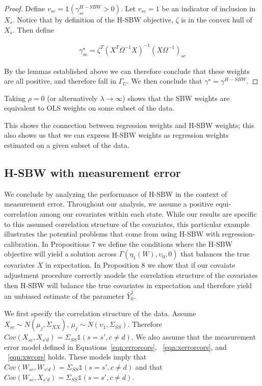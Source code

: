\begin{proof}
Define $v_{sc} = \mathds{1}(\gamma_{sc}^{H-SBW} > 0)$. Let $v_{sc} = 1$ be an indicator of inclusion in $X_s$. Notice that by definition of the H-SBW objective, $\zeta$ is in the convex hull of $X_s$. Then define

\begin{align*}
    \gamma_{sc}^\star = \zeta^T(X^T\Omega^{-1}X)^{-1}(X\Omega^{-1})_{sc}
\end{align*}

By the lemmas established above we can therefore conclude that these weights are all positive, and therefore fall in $\Gamma_U$. We then conclude that $\gamma^\star = \gamma^{H-SBW}$.
\end{proof}

\begin{remark}
Taking $\rho = 0$ (or alternatively $\lambda \to \infty$) shows that the SBW weights are equivalent to OLS weights on some subset of the data.
\end{remark}

This shows the connection between regression weights and H-SBW weights; this also shows us that we can express H-SBW weights as regression weights estimated on a given subset of the data.

\subsection{H-SBW with measurement error}

We conclude by analyzing the performance of H-SBW in the context of measurement error. Throughout our analysis, we assume a positive equi-correlation among our covariates within each state. While our results are specific to this assumed correlation structure of the covariates, this particular example illustrates the potential problems that come from using H-SBW with regression-calibration. In Propositions 7 we define the conditions where the H-SBW objective will yield a solution across $\Gamma(\eta_1(W), \upsilon_0, 0)$ that balances the true covariates $X$ in expectation. In Proposition 8 we show that if our covaiate adjustment procedure correctly models the correlation structure of the covariates then H-SBW will balance the true covariates in expectation and therefore yield an unbiased estimate of the parameter $\bar{Y}_0^1$.

We first specify the correlation structure of the data. Assume $X_{sc} \sim N(\mu_j, \Sigma_{XX})$, $\mu_j \sim N(\upsilon_1, \Sigma_{SS})$. Therefore $Cov(X_{sc}, X_{s'd}) = \Sigma_{SS}\mathds{1}(s = s', c \ne d)$. We also assume that the measurement error model defined in Equations~\ref{eqn:errorcors}, ~\ref{eqn:xerrorcors}, and ~\ref{eqn:xwcors} holds. These models imply that $Cov(W_{sc}, W_{s'd}) = \Sigma_{SS}\mathds{1}(s = s', c \ne d)$ and that $Cov(W_{sc}, X_{s'd}) = \Sigma_{SS}\mathds{1}(s = s', c \ne d)$. 

